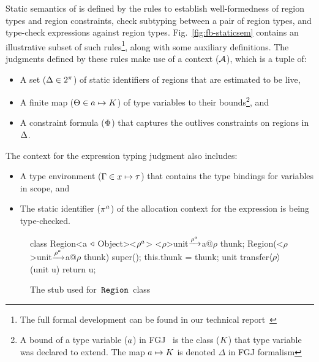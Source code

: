 Static semantics of \fbname is defined by the rules to establish
well-formedness of region types and region constraints, check
subtyping between a pair of region types, and type-check expressions
against region types. Fig.~\ref{fig:fb-staticsem} contains an
illustrative subset of such rules\footnote{The full formal development
can be found in our technical report~\cite{techrep}}, along with some
auxiliary definitions. The judgments defined by these rules make use
of a context (${\mathcal{A}}$), which is a tuple of:
\begin{itemize}
\item A set ($\Delta \in 2^\pi$) of static identifiers of regions
that are estimated to be live,
\item A finite map ($\Theta \in a \mapsto K$) of type
variables to their bounds\footnote{A bound of a type variable
($a$) in FGJ~\cite{fgj} is the class ($K$) that type variable
was declared to extend.  The map $a \mapsto K$ is denoted
$\Delta$ in FGJ formalism}, and
\item A constraint formula ($\Phi$) that captures the outlives
constraints on regions in $\Delta$.
\end{itemize}
The context for the expression typing judgment also includes:
\begin{itemize}
\item A type environment ($\Gamma \in x \mapsto \tau$) that contains the
type bindings for variables in scope, and 
\item The static identifier ($\pi^a$) of the allocation context for
the expression is being type-checked.  
\end{itemize}

\begin{figure}

\begin{codejava}
class Region<a $\triangleleft$ Object><${\rho^a}$> {
  <${\rho}$>unit$\xrightarrow{\rho^a}$a@$\rho$ thunk;
  Region(<${\rho}$>unit$\xrightarrow{\rho^a}$a@$\rho$ thunk) {
    super(); 
    this.thunk = thunk;
  }
  unit transfer$\langle \rho \rangle$(unit u) {
    return u;
  }
}
\end{codejava}

\caption{The stub used for $\,{\tt Region}\,$ class}
\label{fig:region-stub}
\end{figure}

